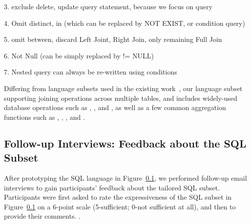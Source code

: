 3. exclude delete, update query statement, because we focus on query

4. Omit distinct, in (which can be replaced by NOT EXIST, or condition query)

5. omit between, discard Left Joint, Right Join, only remaining Full Join

6. Not Null (can be simply replaced by != NULL)

7. Nested query can always be re-written using conditions


Differing from language subsets used in the
existing work~\cite{DasSarma:2010}, our language subset
supporting
joining operations across multiple tables, and includes
widely-used database operations such as ,
, and , as
well as a few common aggregation functions such as , ,
, and .


\subsection{Follow-up Interviews: Feedback about the SQL Subset}

After prototyping the SQL language in Figure~\ref{},
we performed follow-up email interviews to gain
participants' feedback about the tailored SQL
subset. Participants were first asked to rate
the expressiveness of the SQL subset in Figure~\ref{}
on a 6-point scale (5-sufficient; 0-not sufficient at all),
and then to provide their comments.
.

